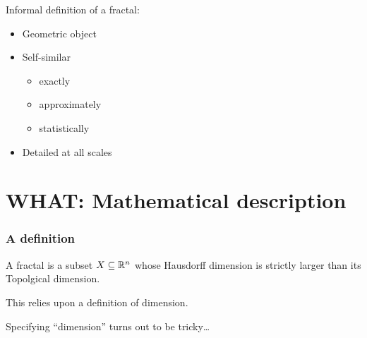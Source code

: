 \documentclass[12pt]{beamer}
\begin{document}
\begin{frame}[standout]

{\Large Informal definition of a fractal:}
\begin{itemize}
	\item Geometric object \pause
	\item Self-similar  \pause
	\begin{itemize}
		\item exactly
		\item approximately
		\item statistically
	\end{itemize}  \pause
	\item Detailed at all scales
\end{itemize}
\end{frame}

\section{WHAT: Mathematical description}

\begin{frame}
\frametitle{A definition}

\begin{definition}[Mandelbrot]
A \alert{fractal} is a subset $X \subseteq \mathbb R^n$ whose Hausdorff dimension is strictly larger than its Topolgical dimension.
\end{definition}

This relies upon a definition of \alert{dimension}.
\pause

Specifying ``dimension'' turns out to be tricky\dots
\end{frame}
\end{document}
